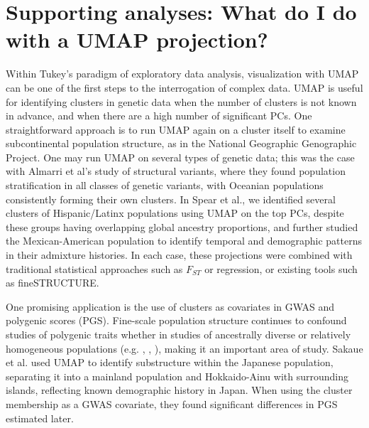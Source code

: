 \documentclass[12pt]{article}
\begin{document}
\section*{Supporting analyses: What do I do with a UMAP projection?}
Within Tukey's paradigm of exploratory data analysis, visualization with UMAP can be one of the first steps to the interrogation of complex data\cite{holmes2018modern}. UMAP is useful for identifying clusters in genetic data when the number of clusters is not known in advance\cite{tonkin-hill_fast_2019}, and when there are a high number of significant PCs\cite{diaz-papkovich_umap_2019}. One straightforward approach is to run UMAP again on a cluster itself to examine subcontinental population structure, as in the National Geographic Genographic Project\cite{dai_population_2020}. One may run UMAP on several types of genetic data; this was the case with Almarri et al's study of structural variants, where they found population stratification in all classes of genetic variants, with Oceanian populations consistently forming their own clusters\cite{almarri_population_2020}. In Spear et al., we identified several clusters of Hispanic/Latinx populations using UMAP on the top PCs, despite these groups having overlapping global ancestry proportions, and further studied the Mexican-American population to identify temporal and demographic patterns in their admixture histories\cite{spear2020recent}. In each case, these projections were combined with traditional statistical approaches such as $F_{ST}$ or regression, or existing tools such as fineSTRUCTURE\cite{lawson2012inference}.

One promising application is the use of clusters as covariates in GWAS and polygenic scores (PGS). Fine-scale population structure continues to confound studies of polygenic traits whether in studies of ancestrally diverse or relatively homogeneous populations (e.g. \cite{kerminen2019geographic}, \cite{berg2019reduced}, \cite{sohail2019polygenic}), making it an important area of study. Sakaue et al. used UMAP to identify substructure within the Japanese population, separating it into a mainland population and Hokkaido-Ainu with surrounding islands, reflecting known demographic history in Japan\cite{sakaue_dimensionality_2020}. When using the cluster membership as a GWAS covariate, they found significant differences in PGS estimated later. 
\end{document}
